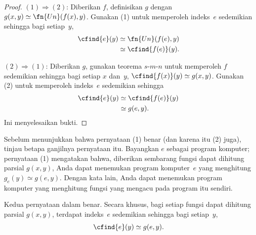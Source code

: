\documentclass[../../../include/open-logic-section]{subfiles}
\begin{document}
\begin{proof}
$(1) \Rightarrow (2)$: Diberikan $f$, definisikan $g$ dengan $g(x,y) \simeq
\fn{Un}(f(x),y)$. Gunakan (1) untuk memperoleh indeks~$e$ sedemikian sehingga
bagi setiap~$y$,
\begin{align*}
\cfind{e}(y) & \simeq \fn{Un}(f(e),y) \\
& \simeq \cfind{f(e)}(y).
\end{align*}

$(2) \Rightarrow (1)$: Diberikan $g$, gunakan teorema $s$-$m$-$n$ untuk
memperoleh $f$ sedemikian sehingga bagi setiap $x$ dan~$y$,
$\cfind{f(x)}(y) \simeq g(x,y)$. Gunakan (2) untuk memperoleh indeks~$e$
sedemikian sehingga
\begin{align*}
\cfind{e}(y) & \simeq \cfind{f(e)}(y) \\
& \simeq g(e,y).
\end{align*}
Ini menyelesaikan bukti.
\end{proof}

\begin{explain}
Sebelum menunjukkan bahwa pernyataan (1) benar (dan karena itu (2) juga),
tinjau betapa ganjilnya pernyataan itu. Bayangkan $e$ sebagai program
komputer; pernyataan (1) mengatakan bahwa, diberikan sembarang fungsi dapat
dihitung parsial $g(x,y)$, Anda dapat menemukan program komputer~$e$ yang
menghitung $g_e(y) \simeq g(e,y)$. Dengan kata lain, Anda dapat menemukan
program komputer yang menghitung fungsi yang mengacu pada program itu sendiri.
\end{explain}

\begin{thm}
Kedua pernyataan dalam  benar. Secara khusus, bagi
setiap fungsi dapat dihitung parsial $g(x,y)$, terdapat indeks~$e$ sedemikian
sehingga bagi setiap~$y$,
\[
\cfind{e}(y) \simeq g(e,y).
\]
\end{thm}
\end{document}
